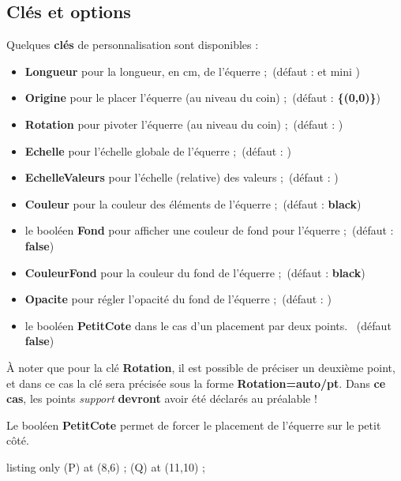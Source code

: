 \documentclass[french,a4paper,11pt]{article}
\newcommand\Cle[1]{{\bfseries\sffamily\textlangle #1\textrangle}}
\begin{document}
\subsection{Clés et options}

\begin{tipblock}
Quelques \Cle{clés} de personnalisation sont disponibles :

\begin{itemize}
	\item \Cle{Longueur} pour la longueur, en cm, de l'équerre ;\hfill~(défaut : \Cle{10} et mini \Cle{4.5})
	\item \Cle{Origine} pour le placer l'équerre (au niveau du coin) ;\hfill~(défaut : \Cle{\{(0,0)\}})
	\item \Cle{Rotation} pour pivoter l'équerre (au niveau du coin) ;\hfill~(défaut : \Cle{0})
	\item \Cle{Echelle} pour l'échelle globale de l'équerre ;\hfill~(défaut : \Cle{1})
	\item \Cle{EchelleValeurs} pour l'échelle (relative) des valeurs ;\hfill~(défaut : \Cle{0.8})
	\item \Cle{Couleur} pour la couleur des éléments de l'équerre ;\hfill~(défaut : \Cle{black})
	\item le booléen \Cle{Fond} pour afficher une couleur de fond pour l'équerre ;\hfill~(défaut : \Cle{false})
	\item \Cle{CouleurFond} pour la couleur du fond de l'équerre ;\hfill~(défaut : \Cle{black})
	\item \Cle{Opacite} pour régler l'opacité du fond de l'équerre ;\hfill~(défaut : \Cle{0.5})
	\item le booléen \Cle{PetitCote} dans le cas d'un placement par deux points. \hfill~(défaut \Cle{false})
\end{itemize}

À noter que pour la clé \Cle{Rotation}, il est possible de préciser un deuxième point, et dans ce cas la clé sera précisée sous la forme \Cle{Rotation=auto/pt}. Dans \textbf{ce cas}, les points \textit{support} \textbf{devront} avoir été déclarés au préalable !

Le booléen \Cle{PetitCote} permet de forcer le placement de l'équerre sur le petit côté.
\end{tipblock}

\begin{PresentationCode}{listing only}
\coordinate (P) at (8,6) ;
\coordinate (Q) at (11,10) ;
\tkzEquerre[Fond]
\tkzEquerre[Echelle=0.61,Origine=P,Couleur=DarkBlue,Rotation=auto/Q]
\tkzEquerre[Longueur=10,Origine={(2.5,-1)},Couleur=red,Rotation=-105]
\end{PresentationCode}
\end{document}
